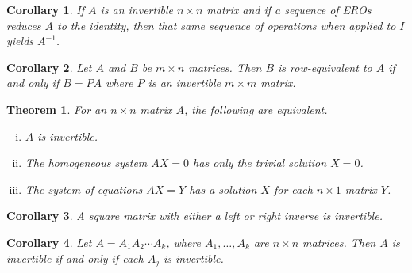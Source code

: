 \documentclass{article}
\newtheorem{theorem}{Theorem}
\newtheorem*{corollary*}{Corollary}
\begin{document}
\begin{corollary*}
  If $A$ is an invertible $n \times n$ matrix and if a sequence of EROs reduces
  $A$ to the identity, then that same sequence of operations when applied to $I$
  yields $A^{-1}$.
\end{corollary*}

\begin{corollary*}
  Let $A$ and $B$ be $m \times n$ matrices. Then $B$ is row-equivalent to $A$ if
  and only if $B = PA$ where $P$ is an invertible $m \times m$ matrix.
\end{corollary*}

\begin{theorem}
  For an $n \times n$ matrix $A$, the following are equivalent.
  \begin{enumerate}[(i)]
    \item $A$ is invertible.
    \item The homogeneous system $AX = 0$ has only the trivial solution $X = 0$.
    \item The system of equations $AX = Y$ has a solution $X$ for each $n \times
      1$ matrix $Y$.
  \end{enumerate}
\end{theorem}

\begin{corollary*}
  A square matrix with either a left or right inverse is invertible.
\end{corollary*}

\begin{corollary*}
  Let $A = A_1A_2 \cdots A_k$, where $A_1, \ldots, A_k$ are $n \times n$
  matrices. Then $A$ is invertible if and only if each $A_j$ is invertible.
\end{corollary*}
\end{document}
